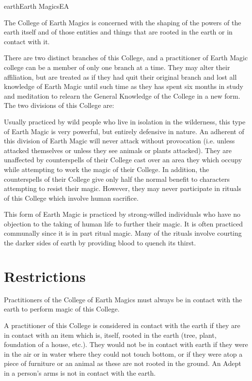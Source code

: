 \begin{College}[1.2]{earth}{Earth Magics}{EA}

The College of Earth Magics is concerned with the shaping of the
powers of the earth itself and of those entities and things that are
rooted in the earth or in contact with it.

There are two distinct branches of this College, and a practitioner of
Earth Magic college can be a member of only one branch at a time.
They may alter their affiliation, but are treated as if they had quit
their original branch and lost all knowledge of Earth Magic until such
time as they has spent six months in study and meditation to relearn
the General Knowledge of the College in a new form. The two divisions
of this College are:
\begin{Description}
\item[Pacifistic Earth Magic] Usually practiced by wild people who
  live in isolation in the wilderness, this type of Earth Magic is
  very powerful, but entirely defensive in nature. An adherent of this
  division of Earth Magic will never attack without provocation (i.e.
  unless attacked themselves or unless they see animals or plants
  attacked). They are unaffected by counterspells of their College
  cast over an area they which occupy while attempting to work the
  magic of their College.  In addition, the counterspells of their
  College give only half the normal benefit to characters attempting
  to resist their magic.  However, they may never participate in
  rituals of this College which involve human sacrifice.

\item[Druidic Earth Magic] This form of Earth Magic is practiced by
  strong-willed individuals who have no objection to the taking of
  human life to further their magic.  It is often practiced communally
  since it is in part ritual magic.  Many of the rituals involve
  courting the darker sides of earth by providing blood to quench its
  thirst.
\end{Description}


\section{Restrictions}

Practitioners of the College of Earth Magics must always be in contact
with the earth to perform magic of this College.

A practitioner of this College is considered in contact with the earth
if they are in contact with an item which is, itself, rooted in the
earth (tree, plant, foundation of a house, etc.). They would not be in
contact with earth if they were in the air or in water where they
could not touch bottom, or if they were atop a piece of furniture or
an animal as these are not rooted in the ground.  An Adept in a
person’s arms is not in contact with the earth.


\end{College}
